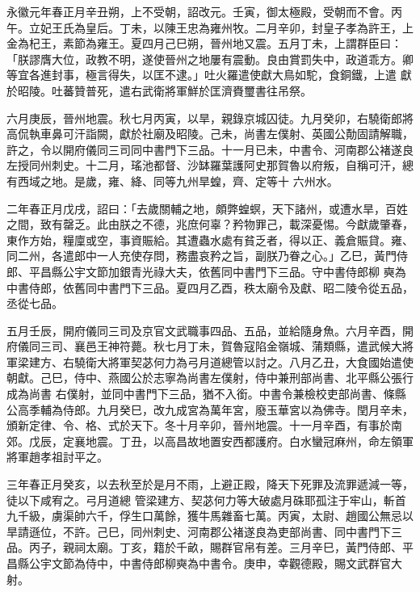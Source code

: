 \begin{pinyinscope}
 永徽元年春正月辛丑朔，上不受朝，詔改元。壬寅，御太極殿，受朝而不會。丙午。立妃王氏為皇后。丁未，以陳王忠為雍州牧。二月辛卯，封皇子孝為許王，上金為杞王，素節為雍王。夏四月己巳朔，晉州地又震。五月丁未，上謂群臣曰：「朕謬膺大位，政教不明，遂使晉州之地屢有震動。良由賞罰失中，政道乖方。卿等宜各進封事，極言得失，以匡不逮。」吐火羅遣使獻大鳥如駝，食銅鐵，上遣
 獻於昭陵。吐蕃贊普死，遣右武衛將軍鮮於匡濟賚璽書往吊祭。



 六月庚辰，晉州地震。秋七月丙寅，以旱，親錄京城囚徒。九月癸卯，右驍衛郎將高侃執車鼻可汗詣闕，獻於社廟及昭陵。己未，尚書左僕射、英國公勣固請解職，許之，令以開府儀同三司同中書門下三品。十一月已未，中書令、河南郡公褚遂良左授同州刺史。十二月，瑤池都督、沙缽羅葉護阿史那賀魯以府叛，自稱可汗，總有西域之地。是歲，雍、絳、同等九州旱蝗，齊、定等十
 六州水。



 二年春正月戊戌，詔曰：「去歲關輔之地，頗弊蝗螟，天下諸州，或遭水旱，百姓之間，致有罄乏。此由朕之不德，兆庶何辜？矜物罪己，載深憂惕。今獻歲肇春，東作方始，糧廩或空，事資賑給。其遭蟲水處有貧乏者，得以正、義倉賑貸。雍、同二州，各遣郎中一人充使存問，務盡哀矜之旨，副朕乃眷之心。」乙巳，黃門侍郎、平昌縣公宇文節加銀青光祿大夫，依舊同中書門下三品。守中書侍郎柳
 奭為中書侍郎，依舊同中書門下三品。夏四月乙酉，秩太廟令及獻、昭二陵令從五品，丞從七品。



 五月壬辰，開府儀同三司及京官文武職事四品、五品，並給隨身魚。六月辛酉，開府儀同三司、襄邑王神符薨。秋七月丁未，賀魯寇陷金嶺城、蒲類縣，遣武候大將軍梁建方、右驍衛大將軍契苾何力為弓月道總管以討之。八月乙丑，大食國始遣使朝獻。己巳，侍中、燕國公於志寧為尚書左僕射，侍中兼刑部尚書、北平縣公張行成為尚書
 右僕射，並同中書門下三品，猶不入銜。中書令兼檢校吏部尚書、條縣公高季輔為侍郎。九月癸巳，改九成宮為萬年宮，廢玉華宮以為佛寺。閏月辛未，頒新定律、令、格、式於天下。冬十月辛卯，晉州地震。十一月辛酉，有事於南郊。戊辰，定襄地震。丁丑，以高昌故地置安西都護府。白水蠻冠麻州，命左領軍將軍趙孝祖討平之。



 三年春正月癸亥，以去秋至於是月不雨，上避正殿，降天下死罪及流罪遞減一等，徒以下咸宥之。弓月道總
 管梁建方、契苾何力等大破處月硃耶孤注于牢山，斬首九千級，虜渠帥六千，俘生口萬餘，獲牛馬雜畜七萬。丙寅，太尉、趙國公無忌以旱請遜位，不許。己巳，同州刺史、河南郡公褚遂良為吏部尚書、同中書門下三品。丙子，親祠太廟。丁亥，籍於千畝，賜群官帛有差。三月辛巳，黃門侍郎、平昌縣公宇文節為侍中，中書侍郎柳奭為中書令。庚申，幸觀德殿，賜文武群官大射。




\end{pinyinscope}
